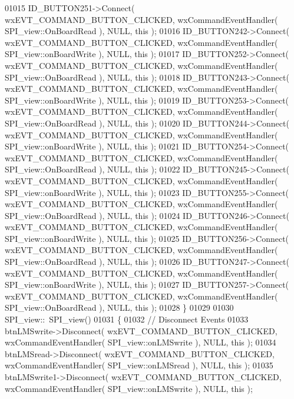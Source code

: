 \begin{DoxyCode}
01015     ID_BUTTON251->Connect( wxEVT\_COMMAND\_BUTTON\_CLICKED, wxCommandEventHandler( 
      SPI_view::OnBoardRead ), NULL, \textcolor{keyword}{this} );
01016     ID_BUTTON242->Connect( wxEVT\_COMMAND\_BUTTON\_CLICKED, wxCommandEventHandler( 
      SPI_view::onBoardWrite ), NULL, \textcolor{keyword}{this} );
01017     ID_BUTTON252->Connect( wxEVT\_COMMAND\_BUTTON\_CLICKED, wxCommandEventHandler( 
      SPI_view::OnBoardRead ), NULL, \textcolor{keyword}{this} );
01018     ID_BUTTON243->Connect( wxEVT\_COMMAND\_BUTTON\_CLICKED, wxCommandEventHandler( 
      SPI_view::onBoardWrite ), NULL, \textcolor{keyword}{this} );
01019     ID_BUTTON253->Connect( wxEVT\_COMMAND\_BUTTON\_CLICKED, wxCommandEventHandler( 
      SPI_view::OnBoardRead ), NULL, \textcolor{keyword}{this} );
01020     ID_BUTTON244->Connect( wxEVT\_COMMAND\_BUTTON\_CLICKED, wxCommandEventHandler( 
      SPI_view::onBoardWrite ), NULL, \textcolor{keyword}{this} );
01021     ID_BUTTON254->Connect( wxEVT\_COMMAND\_BUTTON\_CLICKED, wxCommandEventHandler( 
      SPI_view::OnBoardRead ), NULL, \textcolor{keyword}{this} );
01022     ID_BUTTON245->Connect( wxEVT\_COMMAND\_BUTTON\_CLICKED, wxCommandEventHandler( 
      SPI_view::onBoardWrite ), NULL, \textcolor{keyword}{this} );
01023     ID_BUTTON255->Connect( wxEVT\_COMMAND\_BUTTON\_CLICKED, wxCommandEventHandler( 
      SPI_view::OnBoardRead ), NULL, \textcolor{keyword}{this} );
01024     ID_BUTTON246->Connect( wxEVT\_COMMAND\_BUTTON\_CLICKED, wxCommandEventHandler( 
      SPI_view::onBoardWrite ), NULL, \textcolor{keyword}{this} );
01025     ID_BUTTON256->Connect( wxEVT\_COMMAND\_BUTTON\_CLICKED, wxCommandEventHandler( 
      SPI_view::OnBoardRead ), NULL, \textcolor{keyword}{this} );
01026     ID_BUTTON247->Connect( wxEVT\_COMMAND\_BUTTON\_CLICKED, wxCommandEventHandler( 
      SPI_view::onBoardWrite ), NULL, \textcolor{keyword}{this} );
01027     ID_BUTTON257->Connect( wxEVT\_COMMAND\_BUTTON\_CLICKED, wxCommandEventHandler( 
      SPI_view::OnBoardRead ), NULL, \textcolor{keyword}{this} );
01028 \}
01029 
01030 SPI_view::~SPI_view()
01031 \{
01032     \textcolor{comment}{// Disconnect Events}
01033     btnLMSwrite->Disconnect( wxEVT\_COMMAND\_BUTTON\_CLICKED, wxCommandEventHandler( 
      SPI_view::onLMSwrite ), NULL, \textcolor{keyword}{this} );
01034     btnLMSread->Disconnect( wxEVT\_COMMAND\_BUTTON\_CLICKED, wxCommandEventHandler( 
      SPI_view::onLMSread ), NULL, \textcolor{keyword}{this} );
01035     btnLMSwrite1->Disconnect( wxEVT\_COMMAND\_BUTTON\_CLICKED, wxCommandEventHandler( 
      SPI_view::onLMSwrite ), NULL, \textcolor{keyword}{this} );

\end{DoxyCode}
